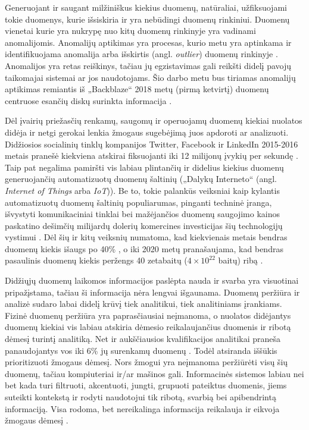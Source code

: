 \documentclass{VUMIFPSkursinis}
\begin{document}
Generuojant ir saugant milžiniškus kiekius duomenų, natūraliai, užfiksuojami tokie duomenys, kurie išsiskiria ir yra nebūdingi duomenų rinkiniui. Duomenų vienetai kurie yra nukrypę nuo kitų duomenų rinkinyje yra vadinami anomalijomis. Anomalijų aptikimas yra procesas, kurio metu yra aptinkama ir identifikuojama anomalija arba išskirtis (angl. \textit{outlier}) duomenų rinkinyje \cite{anomaly}. Anomalijos yra retas reiškinys, tačiau jų egzistavimas gali reikšti didelį pavojų taikomajai sistemai ar jos naudotojams. Šio darbo metu bus tiriamas anomalijų aptikimas remiantis iš „Backblaze“ 2018 metų (pirmą ketvirtį) duomenų centruose esančių diskų surinkta informacija \cite{backblaze}.\par
Dėl įvairių priežasčių renkamų, saugomų ir operuojamų duomenų kiekiai nuolatos didėja ir netgi gerokai lenkia žmogaus sugebėjimą juos apdoroti ar analizuoti. Didžiosios socialinių tinklų kompanijos Twitter, Facebook ir LinkedIn 2015-2016 metais pranešė kiekviena atskirai fiksuojanti iki 12 milijonų įvykių per sekundę \cite{twitter, facebook, linkedin}. Taip pat negalima pamiršti vis labiau plintančių ir didelius kiekius duomenų generuojančių automatizuotų duomenų šaltinių („Dalykų Interneto“ (angl. \textit{Internet of Things} arba \textit{IoT})). Be to, tokie palankūs veiksniai kaip kylantis automatizuotų duomenų šaltinių populiarumas, pinganti techninė įranga, išvystyti komunikaciniai tinklai bei mažėjančios duomenų saugojimo kainos paskatino dešimčių milijardų dolerių komercines investicijas šių technologijų vystimui \cite{iot_investments}. Dėl šių ir kitų veiksnių numatoma, kad kiekvienais metais bendras duomenų kiekis išaugs po 40\% \cite{iot}, o iki 2020 metų pranašaujama, kad bendras pasaulinis duomenų kiekis peržengs 40 zetabaitų ($4\times{10}^{22}$ baitų) ribą \cite{future_data_volume}.\par

Didžiųjų duomenų laikomos informacijos paslėpta nauda ir svarba yra visuotinai pripažįstama, tačiau ši informacija nėra lengvai išgaunama. Duomenų peržiūra ir analizė sudaro labai didelį krūvį tiek analitikui, tiek analitiniams įrankiams. Fizinė duomenų peržiūra yra paprasčiausiai neįmanoma, o nuolatos didėjantys duomenų kiekiai vis labiau atskiria dėmesio reikalaujančius duomenis ir ribotą dėmesį turintį analitiką. Net ir aukščiausios kvalifikacijos analitikai praneša panaudojantys vos iki 6\% jų surenkamų duomenų \cite{prioritizing_attention}. Todėl atsiranda iššūkis prioritizuoti žmogaus dėmesį. Nors žmogui yra neįmanoma peržiūrėti visų šių duomenų, tačiau kompiuteriai ir/ar mašinos gali. Informacinės sistemos labiau nei bet kada turi filtruoti, akcentuoti, jungti, grupuoti pateiktus duomenis, jiems suteikti kontekstą ir rodyti naudotojui tik ribotą, svarbią bei apibendrintą informaciją. Visa rodoma, bet nereikalinga informacija reikalauja ir eikvoja žmogaus dėmesį \cite{attention}.\par
\end{document}
